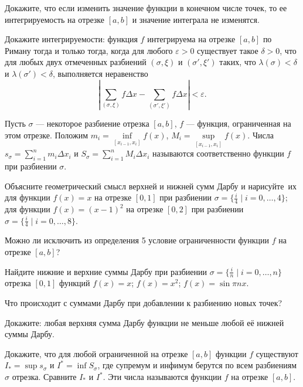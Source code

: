 \documentclass[a4paper, 11pt]{article}
\newcommand{\0}[1]{\overline{#1}}
\begin{document}
Докажите, что если изменить значение функции в конечном числе точек, то ее интегрируемость на отрезке $[a,b]$ и значение интеграла не изменятся.

Докажите  интегрируемости: функция $f$ интегрируема на отрезке $[a,b]$ по Риману тогда и только тогда, когда для любого $\varepsilon>0$ существует такое $\delta>0$, что для любых двух отмеченных разбиений $(\sigma,\xi)$ и $(\sigma',\xi')$ таких, что $\lambda(\sigma)<\delta$ и $\lambda(\sigma')<\delta$, выполняется неравенство
$$
\left|\sum_{(\sigma,\xi)}f\Delta x - \sum_{(\sigma',\xi')}f\Delta x\right|<\varepsilon.
$$


 Пусть $\sigma$ --- некоторое разбиение отрезка $[a,b]$, $f$ --- функция,
ограниченная на этом отрезке. Положим
 $m_i=\inf\limits_{[x_{i-1}, x_i]}f(x)$,
 $M_i=\sup\limits_{[x_{i-1}, x_i]}f(x)$.
  Числа $s_{\sigma}=\sum\limits_{i=1}^n m_i\Delta x_i$ и
  $S_{\sigma}=\sum\limits_{i=1}^n M_i\Delta x_i$ называются соответственно   функции $f$ при разбиении $\sigma$.


 Объясните геометрический смысл верхней и нижней сумм Дарбу
и  нарисуйте\ их  
    для функции $f(x)=x$ на отрезке $[0,1]$ при разбиении
  $\sigma=\{\frac i4 \mid i=0,\ldots,4 \}$;
    для функции $f(x)=(x-1)^2$ на отрезке $[0,2]$ при разбиении
  $\sigma=\{\frac i4 \mid i=0,\ldots,8 \}$.

Можно ли исключить из определения 5 условие ограниченности
функции $f$ на отрезке $[a,b]$?

 Найдите нижние и верхние суммы Дарбу при разбиении
 $\sigma=\{\frac in \mid i=0,\ldots,n \}$ отрезка $[0,1]$
функций 
     $f(x)=x$;
     $f(x)=x^2$;
 $f(x)=\sin\pi n x$.



 Что происходит с суммами Дарбу при добавлении к разбиению новых точек?


 Докажите: любая верхняя  сумма  Дарбу функции не меньше
любой е\"е нижней суммы Дарбу.

 Докажите, что для любой ограниченной  на отрезке $[a,b]$ функции $f$
существуют
$I_*=\sup s_\sigma$ и $I^*=\inf S_\sigma$, где
супремум и инфимум берутся по всем разбиениям $\sigma$ отрезка.
Сравните $I_*$ и $I^*$. Эти числа называются
 функции $f$ на отрезке $[a,b]$.
\end{document}

